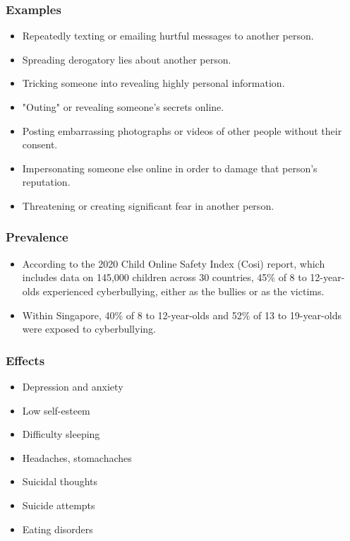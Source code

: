 \documentclass[11pt]{article}
\begin{document}
\subsubsection{Examples}
\label{sec:org7d1bbaf}
\begin{itemize}
\item Repeatedly texting or emailing hurtful messages to another person.
\item Spreading derogatory lies about another person.
\item Tricking someone into revealing highly personal information.
\item "Outing" or revealing someone's secrets online.
\item Posting embarrassing photographs or videos of other people without their consent.
\item Impersonating someone else online in order to damage that person's reputation.
\item Threatening or creating significant fear in another person.
\end{itemize}

\subsubsection{Prevalence}
\label{sec:orgd9e3fff}
\begin{itemize}
\item According to the 2020 Child Online Safety Index (Cosi) report, which includes data on 145,000 children across 30 countries, 45\% of 8 to 12-year-olds experienced cyberbullying, either as the bullies or as the victims.
\item Within Singapore, 40\% of 8 to 12-year-olds and 52\% of 13 to 19-year-olds were exposed to cyberbullying.
\end{itemize}

\subsubsection{Effects}
\label{sec:orgd65cbce}
\begin{itemize}
\item Depression and anxiety
\item Low self-esteem
\item Difficulty sleeping
\item Headaches, stomachaches
\item Suicidal thoughts
\item Suicide attempts
\item Eating disorders
\end{itemize}
\end{document}
